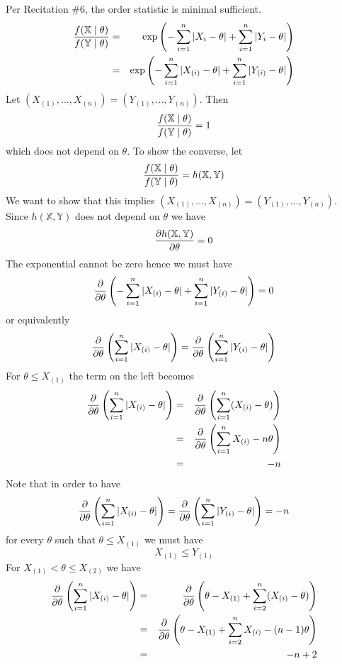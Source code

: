 \bigskip
\noindent
Per Recitation \#6, the order statistic is minimal sufficient.
\begin{eqnarray*}
{f(\mathbb X\mid\theta)\over f(\mathbb Y\mid\theta)}
&=&\exp\left(-\sum_{i=1}^n|X_i-\theta|+\sum_{i=1}^n|Y_i-\theta|\right)\\
&=&\exp\left(-\sum_{i=1}^n|X_{(i)}-\theta|+\sum_{i=1}^n|Y_{(i)}-\theta|\right)
\end{eqnarray*}
Let $(X_{(1)},\ldots,X_{(n)})=(Y_{(1)},\ldots,Y_{(n)})$. Then
$${f(\mathbb X\mid\theta)\over f(\mathbb Y\mid\theta)}=1$$
which does not depend on $\theta$.
To show the converse, let
$${f(\mathbb X\mid\theta)\over f(\mathbb Y\mid\theta)}
=h(\mathbb X,\mathbb Y)$$
We want to show that this implies
$(X_{(1)},\ldots,X_{(n)})=(Y_{(1)},\ldots,Y_{(n)})$.
Since $h(\mathbb X,\mathbb Y)$ does not depend on $\theta$ we have
$${\partial h(\mathbb X,\mathbb Y)\over\partial\theta}=0$$
The exponential cannot be zero hence we must have
$${\partial\over\partial\theta}
\left(-\sum_{i=1}^n|X_{(i)}-\theta|+\sum_{i=1}^n|Y_{(i)}-\theta|\right)=0$$
or equivalently
$$
{\partial\over\partial\theta}
\left(\sum_{i=1}^n|X_{(i)}-\theta|\right)
=
{\partial\over\partial\theta}
\left(\sum_{i=1}^n|Y_{(i)}-\theta|\right)
$$
For $\theta\le X_{(1)}$ the term on the left becomes
\begin{eqnarray*}
{\partial\over\partial\theta}
\left(\sum_{i=1}^n|X_{(i)}-\theta|\right)
&=&
{\partial\over\partial\theta}
\left(\sum_{i=1}^n(X_{(i)}-\theta)\right)\\
&=&
{\partial\over\partial\theta}
\left(\sum_{i=1}^nX_{(i)}-n\theta\right)\\
&=&-n
\end{eqnarray*}
%
%
%
Note that in order to have
$$
{\partial\over\partial\theta}
\left(\sum_{i=1}^n|X_{(i)}-\theta|\right)
=
{\partial\over\partial\theta}
\left(\sum_{i=1}^n|Y_{(i)}-\theta|\right)=-n
$$
for every $\theta$ such that $\theta\le X_{(1)}$ we must have
$$X_{(1)}\le Y_{(1)}$$
%
%
%
For $X_{(1)}<\theta\le X_{(2)}$ we have
\begin{eqnarray*}
{\partial\over\partial\theta}
\left(\sum_{i=1}^n|X_{(i)}-\theta|\right)
&=&
{\partial\over\partial\theta}
\left(\theta-X_{(1)}+\sum_{i=2}^n(X_{(i)}-\theta)\right)\\
&=&
{\partial\over\partial\theta}
\left(\theta-X_{(1)}+\sum_{i=2}^nX_{(i)}-(n-1)\theta\right)\\
&=&-n+2
\end{eqnarray*}
